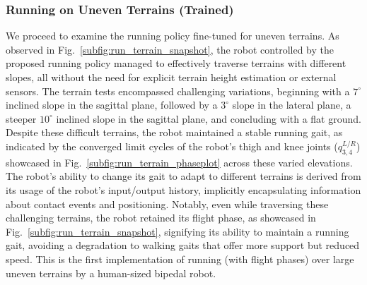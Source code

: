 \subsubsection{Running on Uneven Terrains (Trained)}
We proceed to examine the running policy fine-tuned for uneven terrains. 
As observed in Fig.~\ref{subfig:run_terrain_snapshot}, the robot controlled by the proposed running policy managed to effectively traverse terrains with different slopes, all without the need for explicit terrain height estimation or external sensors.
The terrain tests encompassed challenging variations, beginning with a $7^\circ$ inclined slope in the sagittal plane, followed by a $3^\circ$ slope in the lateral plane, a steeper $10^\circ$ inclined slope in the sagittal plane, and concluding with a flat ground. 
Despite these difficult terrains, the robot maintained a stable running gait, as indicated by the converged limit cycles of the robot's thigh and knee joints ($q^{L/R}_{3,4}$) showcased in Fig.~\ref{subfig:run_terrain_phaseplot} across these varied elevations.
The robot's ability to change its gait to adapt to different terrains is derived from its usage of the robot's input/output history, implicitly encapsulating information about contact events and positioning.
Notably, even while traversing these challenging terrains, the robot retained its flight phase, as showcased in Fig.~\ref{subfig:run_terrain_snapshot}, signifying its ability to maintain a running gait, avoiding a degradation to walking gaits that offer more support but reduced speed.
This is the first implementation of running (with flight phases) over large uneven terrains by a human-sized bipedal robot. 







